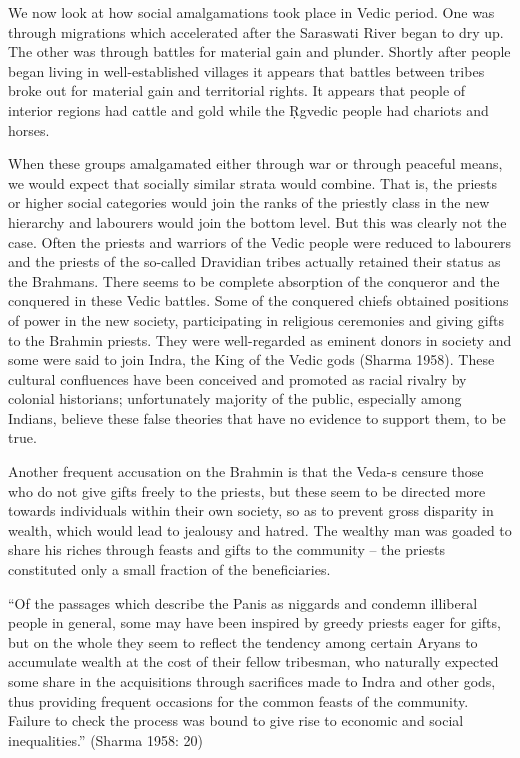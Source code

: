 We now look at how social amalgamations took place in Vedic period. One was through migrations which accelerated after the Saraswati River began to dry up. The other was through battles for material gain and plunder. Shortly after people began living in well-established villages it appears that battles between tribes broke out for material gain and territorial rights. It appears that people of interior regions had cattle and gold while the Ṛgvedic people had chariots and horses. 

When these groups amalgamated either through war or through peaceful means, we would expect that socially similar strata would combine. That is, the priests or higher social categories would join the ranks of the priestly class in the new hierarchy and labourers would join the bottom level. But this was clearly not the case. Often the priests and warriors of the Vedic people were reduced to labourers and the priests of the so-called Dravidian tribes actually retained their status as the Brahmans. There seems to be complete absorption of the conqueror and the conquered in these Vedic battles. Some of the conquered chiefs obtained positions of power in the new society, participating in religious ceremonies and giving gifts to the Brahmin priests. They were well-regarded as eminent donors in society and some were said to join Indra, the King of the Vedic gods (Sharma 1958). These cultural confluences have been conceived and promoted as racial rivalry by colonial historians; unfortunately majority of the public, especially among Indians, believe these false theories that have no evidence to support them, to be true.

Another frequent accusation on the Brahmin is that the Veda-s censure those who do not give gifts freely to the priests, but these seem to be directed more towards individuals within their own society, so as to prevent gross disparity in wealth, which would lead to jealousy and hatred. The wealthy man was goaded to share his riches through feasts and gifts to the community – the priests constituted only a small fraction of the beneficiaries.

\begin{myquote}
“Of the passages which describe the Panis as niggards and condemn illiberal people in general, some may have been inspired by greedy priests eager for gifts, but on the whole they seem to reflect the tendency among certain Aryans to accumulate wealth at the cost of their fellow tribesman, who naturally expected some share in the acquisitions through sacrifices made to Indra and other gods, thus providing frequent occasions for the common feasts of the community. Failure to check the process was bound to give rise to economic and social inequalities.” (Sharma 1958: 20)
\end{myquote}

